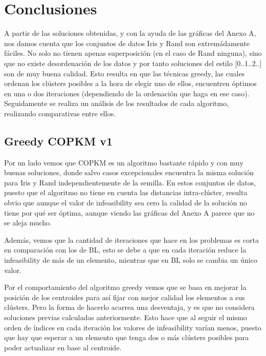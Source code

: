 \section{Conclusiones}


A partir de las soluciones obtenidas, y con la ayuda de las gráficas del Anexo A, nos damos cuenta que los conjuntos de datos Iris y Rand son extremádamente fáciles. No solo no tienen apenas superposición (en el caso de Rand ninguna), sino que no existe desordenación de los datos y por tanto soluciones del estilo [0..1..2..] son de muy buena calidad. Esto resulta en que las técnicas greedy, las cuales ordenan los clústers posibles a la hora de elegir uno de ellos, encuentren óptimos en una o dos iteraciones (dependiendo de la ordenación que haga en ese caso). \\

Seguidamente se realiza un análisis de los resultados de cada algoritmo, realizando comparativas entre ellos.

\subsection{Greedy COPKM v1}

Por un lado vemos que COPKM es un algoritmo bastante rápido y con muy buenas soluciones, donde salvo casos excepcionales encuentra la misma solución para Iris y Rand independientemente de la semilla.
En estos conjuntos de datos, puesto que el algoritmo no tiene en cuenta las distancias intra-clúster, resulta obvio que aunque el valor de infeasibility sea cero la calidad de la solución no tiene por qué ser óptima, aunque viendo las gráficas del Anexo A parece que no se aleja mucho.

Además, vemos que la cantidad de iteraciones que hace en los problemas es corta en comparación con los de BL, esto se debe a que en cada iteración reduce la infeasibility de más de un elemento, mientras que en BL solo se cambia un único valor.

Por el comportamiento del algoritmo greedy vemos que se basa en mejorar la posición de los centroides para así fijar con mejor calidad los elementos a sus clústers. Pero la forma de hacerlo acarrea una desventaja, y es que no considera soluciones previas calculadas anteriormente. Esto hace que al seguir el mismo orden de índices en cada iteración los valores de infeasibility varían menos, puesto que hay que esperar a un elemento que tenga dos o más clústers posibles para poder actualizar en base al centroide.

